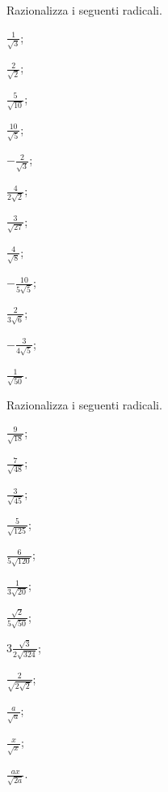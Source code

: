 \begin{esercizio}[\Ast]
 \label{ese:2.68}
Razionalizza i seguenti radicali.
 \begin{multicols}{4}
 \begin{enumeratea}
 \item $\frac 1{\sqrt 3}$;
 \item $\frac 2{\sqrt 2}$;
 \item $\frac 5{\sqrt{10}}$;
 \item $\frac{10}{\sqrt 5}$;
 \item $-\frac 2{\sqrt 3}$;
 \item $\frac 4{2\sqrt 2}$;
 \item $\frac 3{\sqrt{27}}$;
 \item $\frac 4{\sqrt 8}$;
 \item $-\frac{10}{5\sqrt 5}$;
 \item $\frac 2{3\sqrt 6}$;
 \item $-\frac 3{4\sqrt 5}$;
 \item $\frac 1{\sqrt{50}}$.
 \end{enumeratea}
 \end{multicols}
\end{esercizio}

\begin{esercizio}
 \label{ese:2.69}
Razionalizza i seguenti radicali.
 \begin{multicols}{4}
 \begin{enumeratea}
 \item $\frac 9{\sqrt{18}}$;
 \item $\frac 7{\sqrt{48}}$;
 \item $\frac 3{\sqrt{45}}$;
 \item $\frac 5{\sqrt{125}}$;
 \item $\frac 6{5\sqrt{120}}$;
 \item $\frac 1{3\sqrt{20}}$;
 \item $\frac{\sqrt 2}{5\sqrt{50}}$;
 \item $3\frac{\sqrt 3}{2\sqrt{324}}$;
 \item $\frac 2{\sqrt{2\sqrt 2}}$;
 \item $\frac a{\sqrt a}$;
 \item $\frac x{\sqrt x}$;
 \item $\frac{ax}{\sqrt{2a}}$.
 \end{enumeratea}
 \end{multicols}
\end{esercizio}

